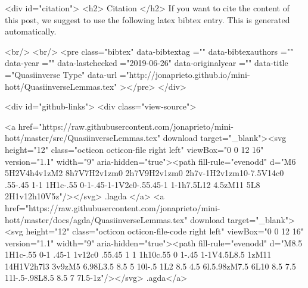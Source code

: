   
  <div id="citation">
  <h2> Citation </h2>
  If you want to cite the content of this post,
  we suggest to use the following latex bibtex entry.
  This is generated automatically.

  <br/>
  <br/>
  <pre class="bibtex"
       data-bibtextag =""
       data-bibtexauthors =""
       data-year =""
       data-lastchecked ="2019-06-26"
       data-originalyear =""
       data-title ="Quasiinverse Type"
       data-url ="http://jonaprieto.github.io/mini-hott/QuasiinverseLemmas.tex"
  ></pre>
  </div>
  

  <div id="github-links">
    <div class="view-source">
      
        <a href="https://raw.githubusercontent.com/jonaprieto/mini-hott/master/src/QuasiinverseLemmas.tex" download target="_blank"><svg height="12" class="octicon octicon-file right left" viewBox="0 0 12 16" version="1.1" width="9" aria-hidden="true"><path fill-rule="evenodd" d="M6 5H2V4h4v1zM2 8h7V7H2v1zm0 2h7V9H2v1zm0 2h7v-1H2v1zm10-7.5V14c0 .55-.45 1-1 1H1c-.55 0-1-.45-1-1V2c0-.55.45-1 1-1h7.5L12 4.5zM11 5L8 2H1v12h10V5z"/></svg> .lagda </a>
        <a href="https://raw.githubusercontent.com/jonaprieto/mini-hott/master/docs/agda/QuasiinverseLemmas.tex" download target="_blank"><svg height="12" class="octicon octicon-file-code right left" viewBox="0 0 12 16" version="1.1" width="9" aria-hidden="true"><path fill-rule="evenodd" d="M8.5 1H1c-.55 0-1 .45-1 1v12c0 .55.45 1 1 1h10c.55 0 1-.45 1-1V4.5L8.5 1zM11 14H1V2h7l3 3v9zM5 6.98L3.5 8.5 5 10l-.5 1L2 8.5 4.5 6l.5.98zM7.5 6L10 8.5 7.5 11l-.5-.98L8.5 8.5 7 7l.5-1z"/></svg> .agda</a>
      
